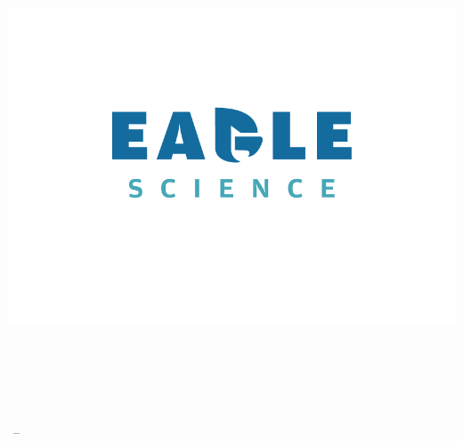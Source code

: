 
\begin{titlepage}

\begin{addmargin}[-1cm]{-3cm}
\begin{center}
\large

\hfill
\vfill

\begingroup
\color{Maroon}\spacedallcaps{\myTitle} \\ \bigskip %
\endgroup

\spacedlowsmallcaps{\myName} %

\vfill

\includegraphics[width=15cm]{gfx/EagleScience_Logo_on_white} \\ \medskip %

\mySubtitle \\ \medskip %
\myDepartment \\
\myFaculty \\
\myUni \\ \bigskip

\myTime\ -- \myVersion %

\vfill

\end{center}
\end{addmargin}

\end{titlepage}